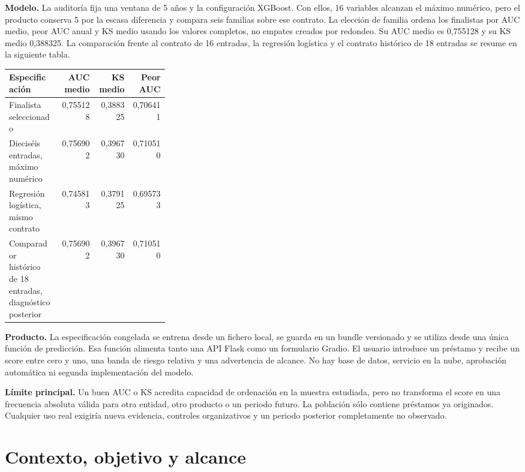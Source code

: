 \documentclass[10pt,a4paper]{article}
\newcommand{\SelectedK}{5}
\newcommand{\SelectedWindow}{5}
\newcommand{\MeanAUC}{0,755128}
\newcommand{\MeanKS}{0,388325}
\newcommand{\WorstAUC}{0,706411}
\newcommand{\WideAUC}{0,756902}
\newcommand{\WideKS}{0,396730}
\newcommand{\WideWorst}{0,710510}
\newcommand{\LogisticAUC}{0,745813}
\newcommand{\LogisticKS}{0,379125}
\newcommand{\LogisticWorst}{0,695733}
\newcommand{\LegacyAUC}{0,756902}
\newcommand{\LegacyKS}{0,396730}
\newcommand{\LegacyWorst}{0,710510}
\begin{document}
\textbf{Modelo.} La auditoría fija una ventana de \SelectedWindow{} años y la
configuración XGBoost. Con ellos, 16 variables alcanzan el máximo numérico, pero
el producto conserva \SelectedK{} por la escasa diferencia y compara seis
familias sobre ese contrato. La elección de familia ordena los finalistas por AUC
medio, peor AUC anual y KS medio usando los valores completos, no empates creados
por redondeo. Su AUC medio es \MeanAUC{} y su KS medio \MeanKS{}. La comparación
frente al contrato de 16 entradas, la regresión logística y el contrato histórico de
18 entradas se resume en la siguiente tabla.

\begin{center}\small
\begin{tabular}{p{0.31\linewidth} r r r}
\textbf{Especificación} & \textbf{AUC medio} & \textbf{KS medio} & \textbf{Peor AUC}\\ \hline
Finalista seleccionado & \MeanAUC{} & \MeanKS{} & \WorstAUC{}\\
Dieciséis entradas, máximo numérico & \WideAUC{} & \WideKS{} & \WideWorst{}\\
Regresión logística, mismo contrato & \LogisticAUC{} & \LogisticKS{} & \LogisticWorst{}\\
Comparador histórico de 18 entradas, diagnóstico posterior & \LegacyAUC{} & \LegacyKS{} & \LegacyWorst{}\\
\end{tabular}
\end{center}

\textbf{Producto.} La especificación congelada se entrena desde un fichero local,
se guarda en un bundle versionado y se utiliza desde una única función de
predicción. Esa función alimenta tanto una API Flask como un formulario Gradio.
El usuario introduce un préstamo y recibe un score entre cero y uno, una banda
de riesgo relativa y una advertencia de alcance. No hay base de datos, servicio
en la nube, aprobación automática ni segunda implementación del modelo.

\textbf{Límite principal.} Un buen AUC o KS acredita capacidad de ordenación en
la muestra estudiada, pero no transforma el score en una frecuencia absoluta
válida para otra entidad, otro producto o un periodo futuro. La población sólo
contiene préstamos ya originados. Cualquier uso real exigiría nueva evidencia,
controles organizativos y un periodo posterior completamente no observado.

\clearpage
\section{Contexto, objetivo y alcance}
\end{document}
